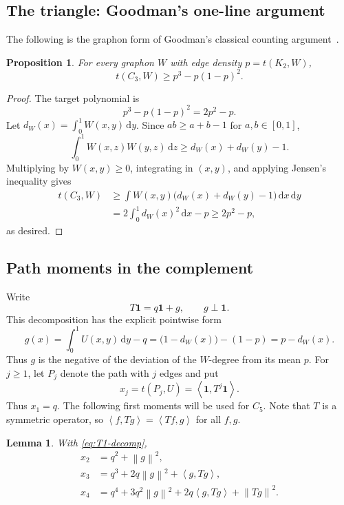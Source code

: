 \documentclass[11pt]{article}
\newtheorem{proposition}[theorem]{Proposition}
\newtheorem{lemma}[theorem]{Lemma}
\numberwithin{equation}{section}
\newcommand{\one}{\mathbf 1}
\newcommand{\ip}[2]{\left\langle #1,#2\right\rangle}
\newcommand{\norm}[1]{\left\lVert #1\right\rVert}
\newcommand{\dd}{\,\mathrm d}
\begin{document}
\subsection{The triangle: Goodman's one-line argument}\label{subsec:C3}

The following is the graphon form of Goodman's classical counting
argument~\cite{Goodman1959}.

\begin{proposition}\label{prop:C3}
  For every graphon $W$ with edge density $p=t(K_2,W)$,
  \[
    t(C_3,W)\ge p^3-p(1-p)^2.
  \]
\end{proposition}

\begin{proof}
  The target polynomial is
  \[
    p^3-p(1-p)^2=2p^2-p.
  \]
  Let $d_W(x)=\int_0^1W(x,y)\dd y$.  Since
  $ab\ge a+b-1$ for $a,b\in[0,1]$,
  \[
    \int_0^1W(x,z)W(y,z)\dd z\ge d_W(x)+d_W(y)-1.
  \]
  Multiplying by $W(x,y)\ge0$, integrating in $(x,y)$, and applying
  Jensen's inequality gives
  \begin{align*}
    t(C_3,W)
    &\ge \int W(x,y)\bigl(d_W(x)+d_W(y)-1\bigr)\dd x\dd y\\
    &=2\int_0^1d_W(x)^2\dd x-p
    \ge2p^2-p,
  \end{align*}
  as desired.
\end{proof}

\subsection{Path moments in the complement}\label{subsec:path-moments}

Write
\begin{equation}\label{eq:T1-decomp}
  T\one=q\one+g,
  \qquad g\perp\one.
\end{equation}
This decomposition has the explicit pointwise form
\[
  g(x)=\int_0^1U(x,y)\dd y-q
  =\bigl(1-d_W(x)\bigr)-(1-p)
  =p-d_W(x).
\]
Thus $g$ is the negative of the deviation of the $W$-degree from its
mean $p$.
For $j\ge1$, let $P_j$ denote the path with $j$ edges and put
\[
  x_j=t(P_j,U)=\ip{\one}{T^j\one}.
\]
Thus $x_1=q$.  The following first moments will be used for $C_5$.
Note that $T$ is a symmetric operator, so $\ip{f}{Tg}=\ip{Tf}{g}$ for all $f,g$.

\begin{lemma}\label{lem:path-to-4}
  With \eqref{eq:T1-decomp},
  \begin{align*}
    x_2&=q^2+\norm g^2,\\
    x_3&=q^3+2q\norm g^2+\ip g{Tg},\\
    x_4&=q^4+3q^2\norm g^2+2q\ip g{Tg}+\norm{Tg}^2.
  \end{align*}
\end{lemma}
\end{document}
